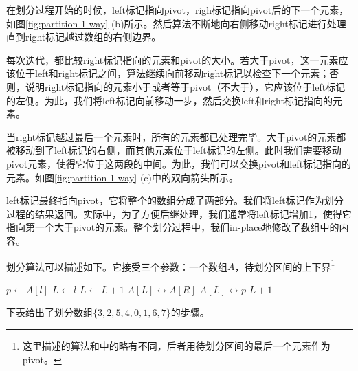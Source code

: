 \documentclass[UTF8]{article}
\begin{document}
在划分过程开始的时候，left标记指向pivot，righ标记指向pivot后的下一个元素，如图\ref{fig:partition-1-way} (b)所示。然后算法不断地向右侧移动right标记进行处理直到right标记越过数组的右侧边界。

每次迭代，都比较right标记指向的元素和pivot的大小。若大于pivot，这一元素应该位于left和right标记之间，算法继续向前移动right标记以检查下一个元素；否则，说明right标记指向的元素小于或者等于pivot（不大于），它应该位于left标记的左侧。为此，我们将left标记向前移动一步，然后交换left和right标记指向的元素。

当right标记越过最后一个元素时，所有的元素都已处理完毕。大于pivot的元素都被移动到了left标记的右侧，而其他元素位于left标记的左侧。此时我们需要移动pivot元素，使得它位于这两段的中间。为此，我们可以交换pivot和left标记指向的元素。如图\ref{fig:partition-1-way} (c)中的双向箭头所示。

left标记最终指向pivot，它将整个的数组分成了两部分。我们将left标记作为划分过程的结果返回。实际中，为了方便后继处理，我们通常将left标记增加1，使得它指向第一个大于pivot的元素。整个划分过程中，我们in-place地修改了数组中的内容。

划分算法可以描述如下。它接受三个参数：一个数组$A$，待划分区间的上下界\footnote{这里描述的算法和\cite{CLRS}中的略有不同，后者用待划分区间的最后一个元素作为pivot。}

\begin{algorithmic}[1]
  \State $p \gets A[l]$  
  \State $L \gets l$ 
   
     
      \State $L \gets L + 1$
      \State {} $A[L] \leftrightarrow A[R]$
    \EndIf
  \EndFor
  \State {} $A[L] \leftrightarrow p$
  \State \Return $L + 1$ 
\EndFunction
\end{algorithmic}

下表给出了划分数组$\{ 3, 2, 5, 4, 0, 1, 6, 7\}$的步骤。
\end{document}
